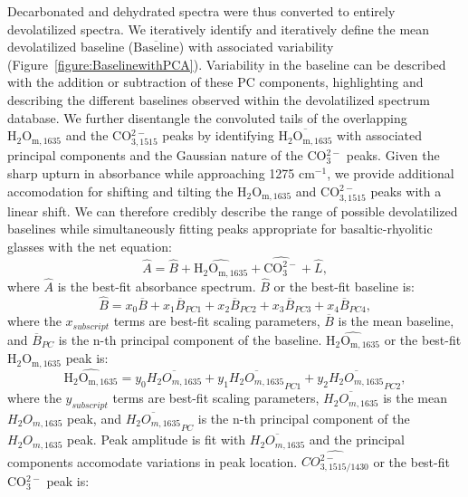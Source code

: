 \documentclass[draft]{agujournal2019}
\begin{document}
Decarbonated and dehydrated spectra were thus converted to entirely devolatilized spectra. We iteratively identify and iteratively define the mean devolatilized baseline ($\mathrm{\overline{Baseline}}$) with associated variability (Figure~\ref{figure:BaselinewithPCA}). Variability in the baseline can be described with the addition or subtraction of these PC components, highlighting and describing the different baselines observed within the devolatilized spectrum database. We further disentangle the convoluted tails of the overlapping $\mathrm{H_2O_{m, 1635}}$ and the CO$_{3, 1515}^{2-}$ peaks by identifying $\mathrm{\overline{H_2O_{m, 1635}}}$ with associated principal components and the Gaussian nature of the CO$_{3}^{2-}$ peaks. Given the sharp upturn in absorbance while approaching 1275 cm$^{-1}$, we provide additional accomodation for shifting and tilting the $\mathrm{H_2O_{m, 1635}}$ and CO$_{3, 1515}^{2-}$ peaks with a linear shift. We can therefore credibly describe the range of possible devolatilized baselines while simultaneously fitting peaks appropriate for basaltic-rhyolitic glasses with the net equation: 
\begin{equation}
    \hat{A} = \hat{B} + \hat{\mathrm{H_2O_{m, 1635}}} + \hat{\mathrm{CO_{3}^{2-}}} + \hat{L}, 
\end{equation}
where $\hat{A}$ is the best-fit absorbance spectrum. 
$\hat{B}$ or the best-fit baseline is: 
\begin{equation}
    \hat{B} = x_0 \overline{B} + x_1 \overline{B}_{PC1} + x_2 \overline{B}_{PC2} + x_3 \overline{B}_{PC3} + x_4 \overline{B}_{PC4}, 
\end{equation}
where the $x_{subscript}$ terms are best-fit scaling parameters, $\overline{B}$ is the mean baseline, and $\overline{B}_{PC}$ is the n-th principal component of the baseline. 
$\hat{\mathrm{H_2O_{m, 1635}}}$ or the best-fit $\mathrm{H_2O_{m, 1635}}$ peak is: 
\begin{equation}
    \hat{\mathrm{H_2O_{m, 1635}}} = y_0 \overline{H_2O_{m, 1635}} + y_1 \overline{H_2O_{m, 1635}}_{PC1} + y_2 \overline{H_2O_{m, 1635}}_{PC2}, 
\end{equation}
where the $y_{subscript}$ terms are best-fit scaling parameters, $\overline{H_2O_{m, 1635}}$ is the mean $H_2O_{m, 1635}$ peak, and $\overline{H_2O_{m, 1635}}_{PC}$ is the n-th principal component of the $H_2O_{m, 1635}$ peak. Peak amplitude is fit with $\overline{H_2O_{m, 1635}}$ and the principal components accomodate variations in peak location. 
$\hat{CO_{3, 1515/1430}^{2-}}$ or the best-fit CO$_{3}^{2-}$ peak is: 
\end{document}
